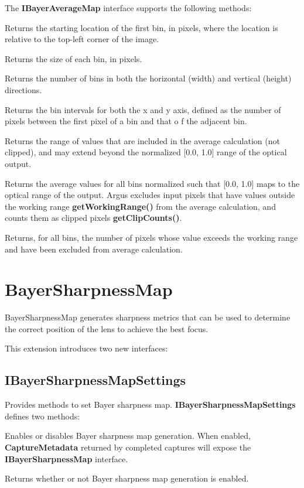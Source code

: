 \documentclass[11pt]{article}
\newcommand{\classname}[1]{\textbf{#1}}
\newcommand{\methodname}[1]{\textbf{#1}}
\begin{document}
The \classname{IBayerAverageMap} interface supports the following methods:

\begin{description}[style=nextline,align=left,leftmargin=4em]
\item[getBinStart()] Returns the starting location of the first bin, in pixels, where the
location is relative to the top-left corner of the image.
\item[getBinSize()] Returns the size of each bin, in pixels.
\item[getBinCount()] Returns the number of bins in both the horizontal (width) and vertical
(height) directions.
\item[getBinInterval()] Returns the bin intervals for both the x and y axis, defined as the
number of pixels between the first pixel of a bin and that o  f the adjacent bin.
\item[getWorkingRange()] Returns the range of values that are included in the average
calculation (not clipped), and may extend beyond the normalized [0.0, 1.0] range of the
optical output.
\item[getAverages()] Returns the average values for all bins normalized such that [0.0, 1.0]
maps to the optical range of the output. Argus excludes input pixels that have values outside the working range
\methodname{getWorkingRange()} from the average calculation, and counts them as clipped
pixels \methodname{getClipCounts()}.
\item[getClipCounts()] Returns, for all bins, the number of pixels whose value exceeds the working
range and have been excluded from average calculation.
\end{description}

\section{BayerSharpnessMap}

BayerSharpnessMap generates sharpness metrics that can be used to determine
the correct position of the lens to achieve the best focus.

This extension introduces two new interfaces:
\subsection{IBayerSharpnessMapSettings} Provides methods to set Bayer sharpness map.
\classname{IBayerSharpnessMapSettings} defines two methods:

\begin{description}[style=nextline,align=left,leftmargin=4em]
\item[setBayerSharpnessMapEnable()] Enables or disables Bayer sharpness map generation.
When enabled, \classname{CaptureMetadata} returned by completed captures will expose the
\classname{IBayerSharpnessMap} interface.
\item[getBayerSharpnessMapEnable()] Returns whether or not Bayer sharpness map generation
is enabled.
\end{description}
\end{document}
